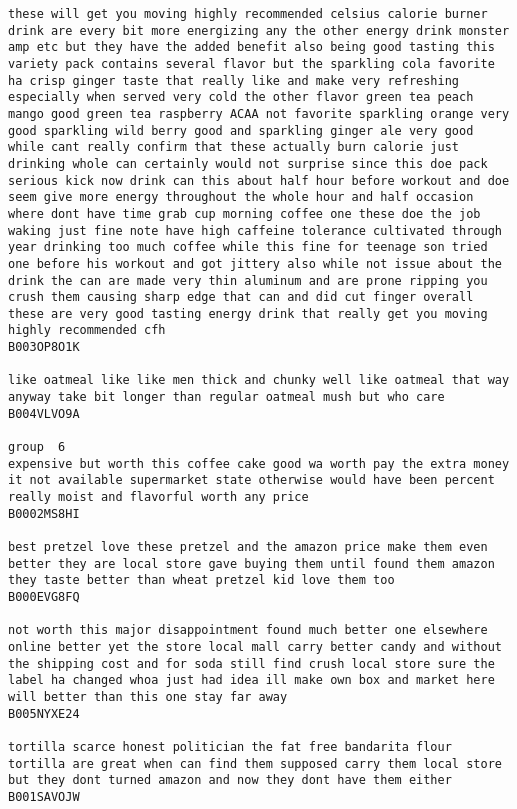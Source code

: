 \documentclass[11pt]{article}
\begin{document}
\begin{Verbatim}[commandchars=\\\{\}]
these will get you moving highly recommended celsius calorie burner drink are every bit more energizing any the other energy drink monster amp etc but they have the added benefit also being good tasting this variety pack contains several flavor but the sparkling cola favorite ha crisp ginger taste that really like and make very refreshing especially when served very cold the other flavor green tea peach mango good green tea raspberry ACAA not favorite sparkling orange very good sparkling wild berry good and sparkling ginger ale very good while cant really confirm that these actually burn calorie just drinking whole can certainly would not surprise since this doe pack serious kick now drink can this about half hour before workout and doe seem give more energy throughout the whole hour and half occasion where dont have time grab cup morning coffee one these doe the job waking just fine note have high caffeine tolerance cultivated through year drinking too much coffee while this fine for teenage son tried one before his workout and got jittery also while not issue about the drink the can are made very thin aluminum and are prone ripping you crush them causing sharp edge that can and did cut finger overall these are very good tasting energy drink that really get you moving highly recommended cfh
B003OP8O1K

like oatmeal like like men thick and chunky well like oatmeal that way anyway take bit longer than regular oatmeal mush but who care
B004VLVO9A

group  6
expensive but worth this coffee cake good wa worth pay the extra money it not available supermarket state otherwise would have been percent really moist and flavorful worth any price
B0002MS8HI

best pretzel love these pretzel and the amazon price make them even better they are local store gave buying them until found them amazon they taste better than wheat pretzel kid love them too
B000EVG8FQ

not worth this major disappointment found much better one elsewhere online better yet the store local mall carry better candy and without the shipping cost and for soda still find crush local store sure the label ha changed whoa just had idea ill make own box and market here will better than this one stay far away
B005NYXE24

tortilla scarce honest politician the fat free bandarita flour tortilla are great when can find them supposed carry them local store but they dont turned amazon and now they dont have them either
B001SAVOJW


\end{Verbatim}
\end{document}

